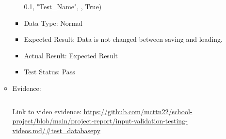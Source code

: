 \documentclass[./project-report/src/latex/project-report.tex]{subfiles}
\begin{document}
\begin{itemize}
\begin{itemize}
\begin{itemize}
                      0.1, \newline
                      "Test\_Name", , \newline
                      True)
				\item Data Type: Normal
				\item Expected Result: Data is not changed between saving and loading.
				\item Actual Result: Expected Result
				\item Test Status: Pass
			\end{itemize}
            \item Evidence:
                \inputminted{python}{./school_project/test/test_database.py}
				\begin{figure}[h!]
				\centering
				\end{figure}

				Link to video evidence: \url{https://github.com/mcttn22/school-project/blob/main/project-report/input-validation-testing-videos.md/#test_databasepy}
		\end{itemize}
    

\end{itemize}
\end{document}
